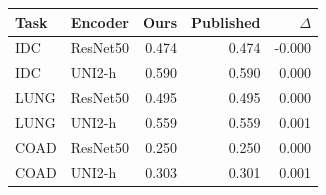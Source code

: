 \begin{tabular}{llrrr}
\toprule
Task & Encoder & Ours & Published & $\Delta$ \\
\midrule
IDC & ResNet50 & 0.474 & 0.474 & -0.000 \\
IDC & UNI2-h & 0.590 & 0.590 & 0.000 \\
LUNG & ResNet50 & 0.495 & 0.495 & 0.000 \\
LUNG & UNI2-h & 0.559 & 0.559 & 0.001 \\
COAD & ResNet50 & 0.250 & 0.250 & 0.000 \\
COAD & UNI2-h & 0.303 & 0.301 & 0.001 \\
\bottomrule
\end{tabular}
